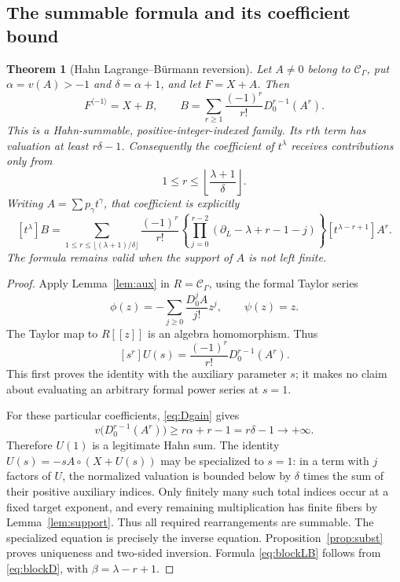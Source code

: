 \documentclass[11pt,a4paper]{article}
\newtheorem{theorem}{Theorem}[section]
\theoremstyle{definition}
\theoremstyle{remark}
\newcommand{\C}{\mathcal C_\Gamma}
\newcommand{\rev}{^{\langle-1\rangle}}
\begin{document}
\subsection{The summable formula and its coefficient bound}
\begin{theorem}[Hahn Lagrange--B\"urmann reversion]\label{thm:LB}
Let $A\ne0$ belong to $\C$, put $\alpha=v(A)>-1$ and
$\delta=\alpha+1$, and let $F=X+A$. Then
\begin{equation}\label{eq:LB}
 F\rev=X+B,\qquad
 B=\sum_{r\ge1}\frac{(-1)^r}{r!}D_0^{r-1}(A^r).
\end{equation}
This is a Hahn-summable, positive-integer-indexed family. Its $r$th term has
valuation at least $r\delta-1$. Consequently the coefficient of $t^\lambda$
receives contributions only from
\begin{equation}\label{eq:rbound}
 1\le r\le\left\lfloor\frac{\lambda+1}{\delta}\right\rfloor.
\end{equation}
Writing $A=\sum p_\gamma t^\gamma$, that coefficient is explicitly
\begin{equation}\label{eq:blockLB}
 [t^\lambda]B=
 \sum_{1\le r\le\lfloor(\lambda+1)/\delta\rfloor}
 \frac{(-1)^r}{r!}
 \left\{\prod_{j=0}^{r-2}
       (\partial_L-\lambda+r-1-j)\right\}
 [t^{\lambda-r+1}]A^r.
\end{equation}
The formula remains valid when the support of $A$ is not left finite.
\end{theorem}
\begin{proof}
Apply Lemma~\ref{lem:aux} in $R=\C$, using the formal Taylor series
\[
 \phi(z)=-\sum_{j\ge0}\frac{D_0^jA}{j!}z^j,\qquad \psi(z)=z.
\]
The Taylor map to $R[[z]]$ is an algebra homomorphism. Thus
\[
 [s^r]U(s)=\frac{(-1)^r}{r!}D_0^{r-1}(A^r).
\]
This first proves the identity with the auxiliary parameter $s$; it makes no
claim about evaluating an arbitrary formal power series at $s=1$.

For these particular coefficients, \eqref{eq:Dgain} gives
\[
 v\bigl(D_0^{r-1}(A^r)\bigr)
 \ge r\alpha+r-1=r\delta-1\longrightarrow+\infty.
\]
Therefore $U(1)$ is a legitimate Hahn sum. The identity
$U(s)=-sA\circ(X+U(s))$ may be specialized to $s=1$: in a term with $j$
factors of $U$, the normalized valuation is bounded below by $\delta$ times
the sum of their positive auxiliary indices. Only finitely many such total
indices occur at a fixed target exponent, and every remaining multiplication
has finite fibers by Lemma~\ref{lem:support}. Thus all required
rearrangements are summable. The specialized equation is precisely the
inverse equation. Proposition~\ref{prop:subst} proves uniqueness and
two-sided inversion. Formula \eqref{eq:blockLB} follows from
\eqref{eq:blockD}, with $\beta=\lambda-r+1$.
\end{proof}
\end{document}
